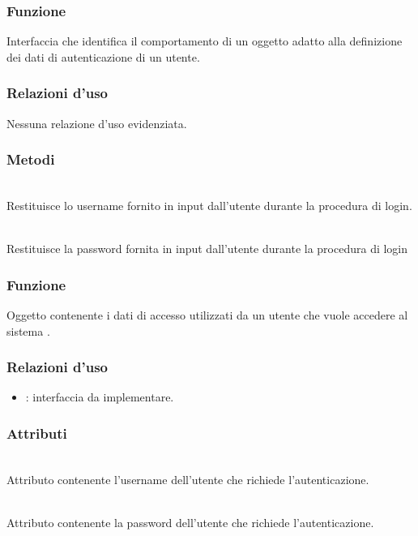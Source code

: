 
\subsubsection*{Funzione}
Interfaccia che identifica il comportamento di un oggetto adatto alla definizione dei dati di autenticazione di un utente.

\subsubsection*{Relazioni d'uso}
Nessuna relazione d'uso evidenziata.

\subsubsection*{Metodi}
\begin{description}
	\item{}\\
Restituisce lo username fornito in input dall'utente durante la procedura di login.
	\item{}\\
Restituisce la password fornita in input dall'utente durante la procedura di login
\end{description}


\subsubsection*{Funzione}
Oggetto contenente i dati di accesso utilizzati da un utente che vuole accedere al sistema \caName.

\subsubsection*{Relazioni d'uso}
\begin{itemize}
	\item {}: interfaccia da implementare.
\end{itemize}

\subsubsection*{Attributi}
\begin{description}
  \item{}\\
	Attributo contenente l'username dell'utente che richiede l'autenticazione.
  \item{}\\
	Attributo contenente la password dell'utente che richiede l'autenticazione.
\end{description}


